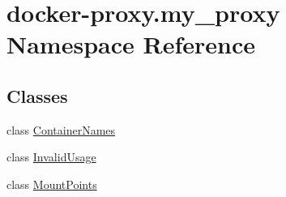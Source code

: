 \hypertarget{namespacedocker-proxy_1_1my__proxy}{}\section{docker-\/proxy.my\+\_\+proxy Namespace Reference}
\label{namespacedocker-proxy_1_1my__proxy}
\subsection*{Classes}
\begin{DoxyCompactItemize}
\item 
class \hyperlink{classdocker-proxy_1_1my__proxy_1_1_container_names}{Container\+Names}
\item 
class \hyperlink{classdocker-proxy_1_1my__proxy_1_1_invalid_usage}{Invalid\+Usage}
\item 
class \hyperlink{classdocker-proxy_1_1my__proxy_1_1_mount_points}{Mount\+Points}
\end{DoxyCompactItemize}
